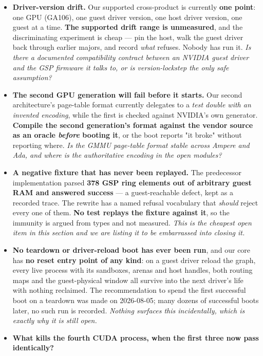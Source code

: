\documentclass[10.5pt]{article}
\begin{document}
\begin{itemize}[itemsep=0.5ex]
\item \textbf{Driver-version drift.} Our supported cross-product is currently \textbf{one point}:
  one GPU (GA106), one guest driver version, one host driver version, one guest at a time.
  \textbf{The supported drift range is unmeasured}, and the discriminating experiment is cheap —
  pin the host, walk the guest driver back through earlier majors, and record \emph{what} refuses.
  Nobody has run it. \emph{Is there a documented compatibility contract between an NVIDIA guest
  driver and the GSP firmware it talks to, or is version-lockstep the only safe assumption?}
\item \textbf{The second GPU generation will fail before it starts.} Our second architecture's
  page-table format currently delegates to a \emph{test double with an invented encoding}, while
  the first is checked against NVIDIA's own generator. \textbf{Compile the second generation's
  format against the vendor source as an oracle \emph{before} booting it}, or the boot reports
  "it broke" without reporting where. \emph{Is the GMMU page-table format stable across Ampere and
  Ada, and where is the authoritative encoding in the open modules?}
\item \textbf{A negative fixture that has never been replayed.} The predecessor implementation
  parsed \textbf{378 GSP ring elements out of arbitrary guest RAM and answered success} — a
  guest-reachable defect, kept as a recorded trace. The rewrite has a named refusal vocabulary
  that \emph{should} reject every one of them. \textbf{No test replays the fixture against it}, so
  the immunity is argued from types and not measured. \emph{This is the cheapest open item in this
  section and we are listing it to be embarrassed into closing it.}
\item \textbf{No teardown or driver-reload boot has ever been run}, and our core has \textbf{no
  reset entry point of any kind}: on a guest driver reload the graph, every live process with its
  sandboxes, arenas and host handles, both routing maps and the guest-physical window all survive
  into the next driver's life with nothing reclaimed. The recommendation to spend the first
  successful boot on a teardown was made on 2026-08-05; many dozens of successful boots later, no
  such run is recorded. \emph{Nothing surfaces this incidentally, which is exactly why it is
  still open.}
\item \textbf{What kills the fourth CUDA process, when the first three now pass identically?}

\end{itemize}
\end{document}
